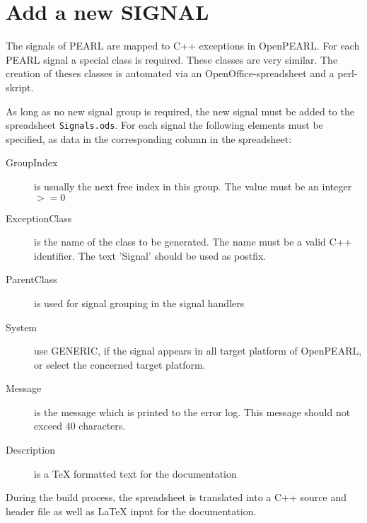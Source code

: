 \section{Add a new SIGNAL}
The signals of PEARL are mapped to C++ exceptions in OpenPEARL.
For each PEARL signal a special class is required.
These classes are very similar. The creation of theses classes
is automated via an OpenOffice-spreadsheet and a perl-skript.

As long as no new signal group is required, the new signal
must be added to the spreadsheet \texttt{Signals.ods}.
For each signal the following elements must be specified, as 
data in the corresponding column in the spreadsheet:
\begin{description} 
\item[GroupIndex] is usually the next free index in this group.
   The value must be an integer $>= 0$
\item [ExceptionClass] is the name of the class to be generated.
   The name must be a valid C++ identifier. The text 'Signal' should
   be used as postfix.
\item[ParentClass] is used for signal grouping in the signal handlers
\item[System] use GENERIC, if the signal appears in all target
   platform of OpenPEARL, or select the concerned target platform.
\item[Message] is the message which is printed to the error log.
   This message should not exceed 40 characters.
\item[Description] is a TeX formatted text for the documentation
\end{description}

During the build process, the spreadsheet is translated into a C++ source
and  header file as well as LaTeX input for the documentation.
